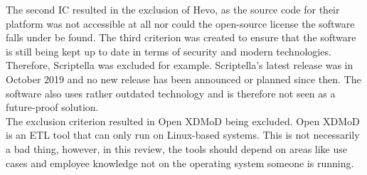 \documentclass[11pt]{article}
\begin{document}
The second IC resulted in the exclusion of Hevo, as the source code for their platform was not accessible at all nor could the open-source license the software falls under be found. The third criterion was created to ensure that the software is still being kept up to date in terms of security and modern technologies. Therefore, Scriptella was excluded for example. Scriptella’s latest release was in October 2019 and no new release has been announced or planned since then. The software also uses rather outdated technology and is therefore not seen as a future-proof solution. \\

The exclusion criterion resulted in Open XDMoD being excluded. Open XDMoD is an ETL tool that can only run on Linux-based systems. This is not necessarily a bad thing, however, in this review, the tools should depend on areas like use cases and employee knowledge not on the operating system someone is running. \\
\end{document}
